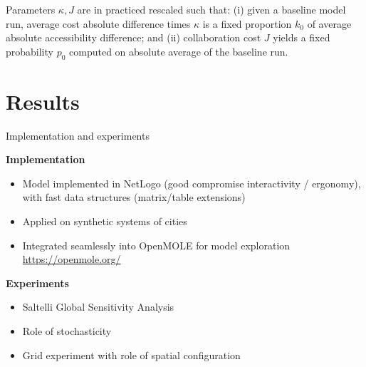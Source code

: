 \documentclass[12pt]{iopart}
\begin{document}


Parameters $\kappa, J$ are in practiced rescaled such that: (i) given a baseline model run, average cost absolute difference times $\kappa$ is a fixed proportion $k_0$ of average absolute accessibility difference; and (ii) collaboration cost $J$ yields a fixed probability $p_0$ computed on absolute average of the baseline run.






\section{Results}

Implementation and experiments




\textbf{Implementation}

\begin{itemize}
	\item Model implemented in NetLogo (good compromise interactivity / ergonomy), with fast data structures (matrix/table extensions)
	\item Applied on synthetic systems of cities \cite{raimbault2019second}
	\item Integrated seamlessly into OpenMOLE \cite{reuillon2013openmole} for model exploration \url{https://openmole.org/}
\end{itemize}




\textbf{Experiments}

\begin{itemize}
	\item Saltelli Global Sensitivity Analysis \cite{saltelli2008global}
	\item Role of stochasticity
	\item Grid experiment with role of spatial configuration
\end{itemize}
\end{document}
